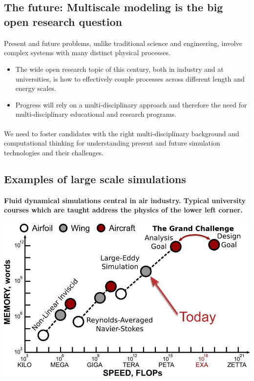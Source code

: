 \documentclass[%
oneside,                 %
final,                   %
10pt]{article}
\begin{document}
\subsection{The future: Multiscale modeling is the big open research question}


\paragraph{}
Present and future problems, unlike traditional
science and engineering, involve complex systems with many distinct
physical processes. 
\begin{itemize}
\item The wide open research topic of this century, both in industry and at universities, is how to effectively couple processes across different length and energy scales. 

\item Progress will rely on a multi-disciplinary approach and therefore the  need for multi-disciplinary educational and research programs.
\end{itemize}

\noindent




\paragraph{}
We need to foster candidates with the right
multi-disciplinary background and computational thinking for
understanding present and future simulation technologies and their challenges.




\subsection{Examples of large scale simulations}

\paragraph{Fluid dynamical simulations central in air industry.  Typical university courses which are taught address the physics of the lower left corner.}


\centerline{\includegraphics[width=0.6\linewidth]{fig-future/fig10.jpg}}
\end{document}
